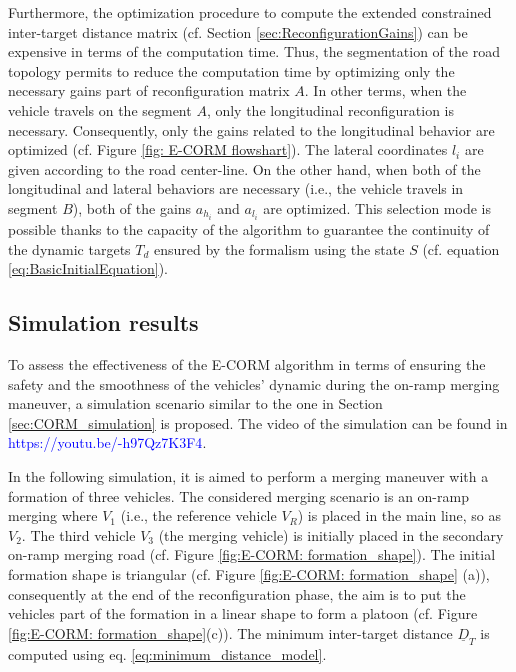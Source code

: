 Furthermore, the optimization procedure to compute the extended constrained inter-target distance matrix (cf. Section \ref{sec:ReconfigurationGains}) can be expensive in terms of the computation time. Thus, the segmentation of the road topology permits to reduce the computation time by optimizing only the necessary gains part of reconfiguration matrix $A$. In other terms, when the vehicle travels on the segment $A$, only the longitudinal reconfiguration is necessary. Consequently, only the gains related to the longitudinal behavior are optimized (cf. Figure \ref{fig: E-CORM flowshart}). The lateral coordinates $l_i$ are given according to the road center-line. On the other hand, when both of the longitudinal and lateral behaviors are necessary (i.e., the vehicle travels in segment $B$), both of the gains $a_{h_{i}}$ and $a_{l_{i}}$ are optimized. This selection mode is possible thanks to the capacity of the algorithm to guarantee the continuity of the dynamic targets $T_d$ ensured by the formalism using the state $S$ (cf. equation \ref{eq:BasicInitialEquation}).  

\subsection{Simulation results}\label{sec:Simulation_E-CORM}



To assess the effectiveness of the E-CORM algorithm in terms of ensuring the safety and the smoothness of the vehicles' dynamic during the on-ramp merging maneuver, a simulation scenario similar to the one in Section \ref{sec:CORM_simulation} is proposed. The video of the simulation can be found in \textcolor{blue}{https://youtu.be/-h97Qz7K3F4}. 


In the following simulation, it is aimed to perform a merging maneuver with a formation of three vehicles. The considered merging scenario is an on-ramp merging where $V_1$ (i.e., the reference vehicle $V_R$) is placed in the main line, so as $V_2$. The third vehicle $V_3$ (the merging vehicle) is initially placed in the secondary on-ramp merging road (cf. Figure \ref{fig:E-CORM: formation_shape}). The initial formation shape is triangular (cf. Figure \ref{fig:E-CORM: formation_shape} (a)), consequently at the end of the reconfiguration phase, the aim is to put the vehicles part of the formation in a linear shape to form a platoon (cf. Figure \ref{fig:E-CORM: formation_shape}(c)). The minimum inter-target distance $\underline{D}_T$ is computed using eq. \ref{eq:minimum_distance_model}.




